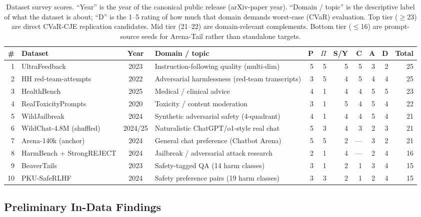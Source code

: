 \begin{table}[h]
\centering
\footnotesize
\begin{tabular}{rlcp{3.4cm}rrrrrrr}
\toprule
\# & Dataset & Year & Domain / topic & P & \(\Pi\) & S/Y & C & A & D & Total \\
\midrule
1 & UltraFeedback & 2023 & Instruction-following quality (multi-dim) & 5 & 5 & 5 & 5 & 3 & 2 & 25 \\
2 & HH red-team-attempts & 2022 & Adversarial harmlessness (red-team transcripts) & 3 & 5 & 4 & 5 & 4 & 4 & 25 \\
3 & HealthBench & 2025 & Medical / clinical advice & 4 & 1 & 4 & 4 & 5 & 5 & 23 \\
4 & RealToxicityPrompts & 2020 & Toxicity / content moderation & 3 & 1 & 5 & 4 & 5 & 4 & 22 \\
5 & WildJailbreak & 2024 & Synthetic adversarial safety (4-quadrant) & 4 & 1 & 4 & 4 & 5 & 4 & 21 \\
6 & WildChat-4.8M (shuffled) & 2024/25 & Naturalistic ChatGPT/o1-style real chat & 5 & 3 & 4 & 3 & 2 & 3 & 21 \\
7 & Arena-140k (anchor) & 2024 & General chat preference (Chatbot Arena) & 5 & 5 & 2 & --- & 3 & 2 & 21 \\
8 & HarmBench + StrongREJECT & 2024 & Jailbreak / adversarial attack research & 2 & 1 & 4 & --- & 2 & 4 & 16 \\
9 & BeaverTails & 2023 & Safety-tagged QA (14 harm classes) & 3 & 1 & 2 & 1 & 3 & 4 & 15 \\
10 & PKU-SafeRLHF & 2024 & Safety preference pairs (19 harm classes) & 3 & 3 & 2 & 1 & 2 & 4 & 15 \\
\bottomrule
\end{tabular}
\caption{Dataset survey scores. ``Year'' is the year of the canonical
public release (arXiv-paper year). ``Domain / topic'' is the descriptive
label of what the dataset is about; ``D'' is the 1--5 rating of how
much that domain demands worst-case (CVaR) evaluation. Top tier
(\(\geq\)23) are direct CVaR-CJE replication candidates. Mid tier
(21--22) are domain-relevant complements. Bottom tier (\(\leq\)16) are
prompt-source seeds for Arena-Tail rather than standalone targets.}
\label{tab:dataset-survey}
\end{table}

\subsection{Preliminary In-Data Findings}
\label{app:dataset:findings}

